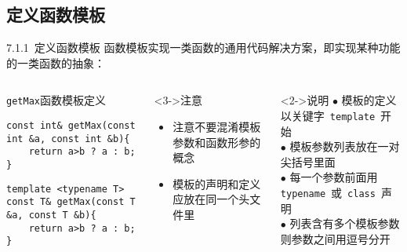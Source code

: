 \subsection{定义函数模板}

\begin{frame}[fragile]{7.1.1~定义函数模板}
\vspace{-3mm}
函数模板实现\alert{一类函数}的\alert{通用}代码解决方案，即实现某种功能的\alert{一类函数的抽象}：

\vspace{-4mm}

\begin{columns}[t]

\begin{blueblock}{\texttt{getMax}函数模板定义}

\begin{lstlisting}[moreemph={T}]
const int& getMax(const int &a, const int &b){
    return a>b ? a : b;
}
\end{lstlisting}
\begin{lstlisting}[moreemph={T}]
template <typename T>
const T& getMax(const T &a, const T &b){
    return a>b ? a : b;
}
\end{lstlisting}

\end{blueblock}

\begin{redblock}<3->{注意}
\begin{itemize}
  \item 注意不要混淆\alert{模板参数}和\alert{函数形参}的概念
  \item 模板的声明和定义应放在同一个头文件里
\end{itemize}
\end{redblock}

\begin{yellowblock}<2->{说明}
$\bullet$ 模板的定义以关键字~\alert{\texttt{template}}~开始\\
$\bullet$ 模板参数列表放在一对\alert{尖括号}里面\\
$\bullet$ 每一个参数前面用\\\alert{\texttt{typename}}~或~\alert{\texttt{class}}~声明\\
$\bullet$ 列表含有多个模板参数则参数之间用\alert{逗号}分开
\end{yellowblock}

\end{columns}
\end{frame}

